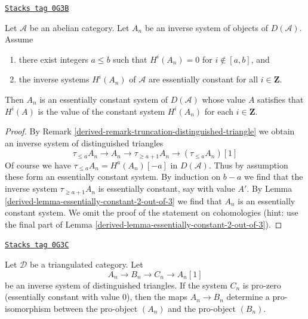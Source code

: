 \begin{lemma}
\label{derived-lemma-essentially-constant-cohomology}
\href{https://stacks.math.columbia.edu/tag/0G3B}{\texttt{Stacks tag 0G3B}}

Let $\mathcal{A}$ be an abelian category. Let $A_n$ be an inverse
system of objects of $D(\mathcal{A})$. Assume
\begin{enumerate}
\item there exist integers $a \leq b$ such that $H^i(A_n) = 0$
for $i \not \in [a, b]$, and
\item the inverse systems $H^i(A_n)$ of $\mathcal{A}$ are essentially constant
for all $i \in \mathbf{Z}$.
\end{enumerate}
Then $A_n$ is an essentially constant system of $D(\mathcal{A})$ whose
value $A$ satisfies that $H^i(A)$ is the value of the constant system
$H^i(A_n)$ for each $i \in \mathbf{Z}$.
\end{lemma}

\begin{proof}

By Remark \ref{derived-remark-truncation-distinguished-triangle} we obtain
an inverse system of distinguished triangles
$$
\tau_{\leq a}A_n \to A_n \to \tau_{\geq a + 1}A_n \to (\tau_{\leq a}A_n)[1]
$$
Of course we have $\tau_{\leq a}A_n = H^a(A_n)[-a]$ in $D(\mathcal{A})$.
Thus by assumption these form an essentially constant system.
By induction on $b - a$ we find that the inverse system
$\tau_{\geq a + 1}A_n$ is essentially constant, say with value $A'$.
By Lemma \ref{derived-lemma-essentially-constant-2-out-of-3} we find that
$A_n$ is an essentially constant system. We omit the proof of
the statement on cohomologies (hint: use the final part of
Lemma \ref{derived-lemma-essentially-constant-2-out-of-3}).
\end{proof}

\begin{lemma}
\label{derived-lemma-pro-isomorphism}
\href{https://stacks.math.columbia.edu/tag/0G3C}{\texttt{Stacks tag 0G3C}}

Let $\mathcal{D}$ be a triangulated category. Let
$$
A_n \to B_n \to C_n \to A_n[1]
$$
be an inverse system of distinguished triangles. If the system $C_n$
is pro-zero (essentially constant with value $0$), then the maps
$A_n \to B_n$ determine a pro-isomorphism between the pro-object $(A_n)$
and the pro-object $(B_n)$.
\end{lemma}

